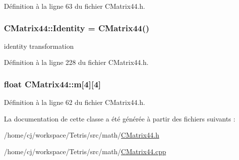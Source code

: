 Définition à la ligne 63 du fichier C\-Matrix44.\-h.

\hypertarget{class_c_matrix44_a18198dedeaf35ac255b368f5c54ceed0}{
\subsubsection[{Identity}]{ C\-Matrix44\-::\-Identity = {\bf C\-Matrix44}()\hspace{0.3cm}{\ttfamily [static]}}}\label{class_c_matrix44_a18198dedeaf35ac255b368f5c54ceed0}


identity transformation 



Définition à la ligne 228 du fichier C\-Matrix44.\-h.

\hypertarget{class_c_matrix44_a0cdad394489ff192554c7f29ca5ae78a}{
\subsubsection[{m}]{\setlength{\rightskip}{0pt plus 5cm}float C\-Matrix44\-::m\mbox{[}4\mbox{]}\mbox{[}4\mbox{]}}}\label{class_c_matrix44_a0cdad394489ff192554c7f29ca5ae78a}


Définition à la ligne 62 du fichier C\-Matrix44.\-h.



La documentation de cette classe a été générée à partir des fichiers suivants \-:\begin{DoxyCompactItemize}
\item 
/home/cj/workspace/\-Tetris/src/math/\hyperlink{_c_matrix44_8h}{C\-Matrix44.\-h}\item 
/home/cj/workspace/\-Tetris/src/math/\hyperlink{_c_matrix44_8cpp}{C\-Matrix44.\-cpp}\end{DoxyCompactItemize}
